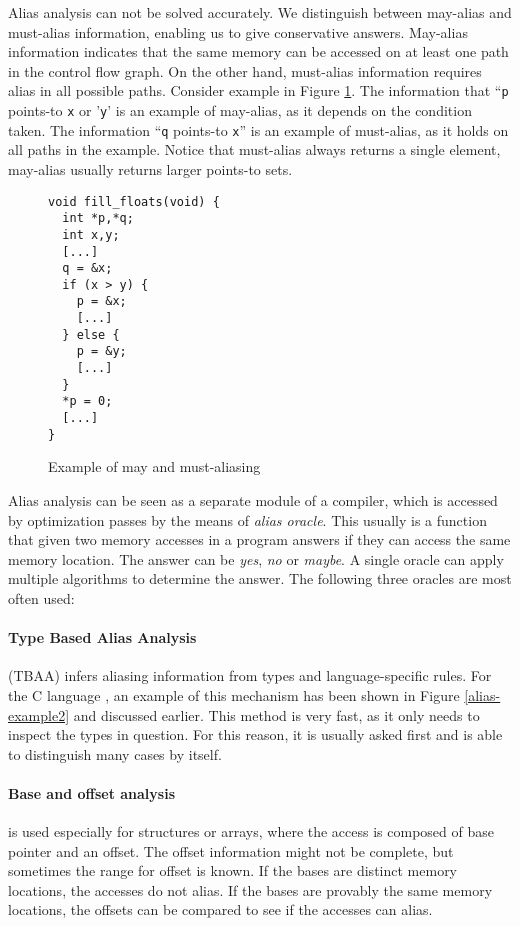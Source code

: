 Alias analysis can not be solved accurately.  We distinguish between may-alias
and must-alias information, enabling us to give conservative answers.  May-alias
information indicates that the same memory can be accessed on at least one path
in the control flow graph. On the other hand, must-alias information requires
alias in all possible paths. Consider example in Figure
\ref{alias-example-maymust}. The information that ``{\tt p} points-to {\tt x} or
'{\tt y}' is an example of may-alias, as it depends on the condition taken.
The information ``{\tt q} points-to {\tt x}'' is an example of must-alias, as it
holds on all paths in the example. Notice that must-alias always returns a
single element, may-alias usually returns larger points-to sets.

\begin{figure}[!ht]
\begin{tcolorbox}
\begin{verbatim}
void fill_floats(void) {
  int *p,*q;
  int x,y;
  [...]
  q = &x;
  if (x > y) {
    p = &x;
    [...]
  } else {
    p = &y;
    [...]
  }
  *p = 0;
  [...]
}
\end{verbatim}
\end{tcolorbox}
\caption{Example of may and must-aliasing}
\label{alias-example-maymust}
\end{figure}

Alias analysis can be seen as a separate module of a compiler, which is accessed
by optimization passes by the means of {\it alias oracle}. This usually is a
function that given two memory accesses in a program answers if they can access
the same memory location. The answer can be {\it yes}, {\it no} or {\it maybe}.
A single oracle can apply multiple algorithms to determine the answer. The
following three oracles are most often used:

\label{sec-tbaa}
\paragraph{Type Based Alias Analysis} (TBAA) infers aliasing information from
types and language-specific rules. For the C language \cite{isoc}, an example of
this mechanism has been shown in Figure \ref{alias-example2} and discussed
earlier.  This method is very fast, as it only needs to inspect the types in
question. For this reason, it is usually asked first and is able to distinguish
many cases by itself.

\label{sec-baseoffset}
\paragraph{Base and offset analysis}
is used especially for structures or arrays, where the access is composed of base pointer and
an offset. The offset information might not be complete, but sometimes the range
for offset is known. If the bases are distinct memory locations, the accesses do
not alias.  If the bases are provably the same memory locations, the offsets can
be compared to see if the accesses can alias.

